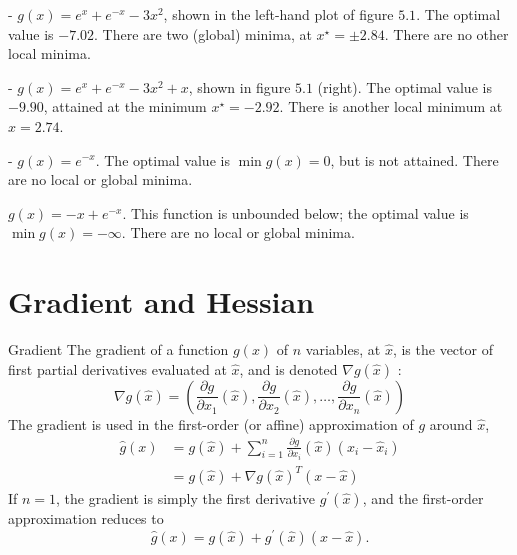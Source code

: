 \begin{example}
    - $ g(x)=e^{x}+e^{-x}-3 x^{2} $, shown in the left-hand plot of figure $ 5.1 $. The optimal value is $ -7.02 $. There are two (global) minima, at $ x^{\star}=\pm 2.84 $. There are no other local minima.
\end{example}

\begin{example}
    - $ g(x)=e^{x}+e^{-x}-3 x^{2}+x $, shown in figure $ 5.1 $ (right). The optimal value is $ -9.90 $, attained at the minimum $ x^{\star}=-2.92 . $ There is another local minimum at $ x=2.74 $.
\end{example}

\begin{example}
    - $ g(x)=e^{-x} $. The optimal value is $ \min g(x)=0 $, but is not attained. There are no local or global minima.
\end{example}

\begin{example}
    $ g(x)=-x+e^{-x} $. This function is unbounded below; the optimal value is $ \min g(x)=-\infty $. There are no local or global minima.
\end{example}

\section{Gradient and Hessian}

\begin{definition}
    Gradient The gradient of a function $ g(x) $ of $ n $ variables, at $ \hat{x} $, is the vector of first partial derivatives evaluated at $ \hat{x} $, and is denoted $ \nabla g(\hat{x}) $ :
$$
\nabla g(\hat{x})=\left(\frac{\partial g}{\partial x_{1}}(\hat{x}), \frac{\partial g}{\partial x_{2}}(\hat{x}), \ldots, \frac{\partial g}{\partial x_{n}}(\hat{x})\right)
$$
The gradient is used in the first-order (or affine) approximation of $ g $ around $ \hat{x} $,
$$
\begin{aligned}
\hat{g}(x) &=g(\hat{x})+\sum_{i=1}^{n} \frac{\partial g}{\partial x_{i}}(\hat{x})\left(x_{i}-\hat{x}_{i}\right) \\
&=g(\hat{x})+\nabla g(\hat{x})^{T}(x-\hat{x})
\end{aligned}
$$
If $ n=1 $, the gradient is simply the first derivative $ g^{\prime}(\hat{x}) $, and the first-order approximation reduces to
$$
\hat{g}(x)=g(\hat{x})+g^{\prime}(\hat{x})(x-\hat{x}) .
$$
\end{definition}

